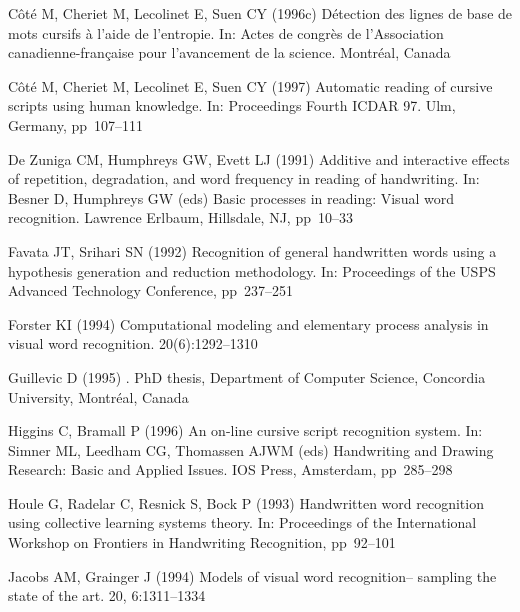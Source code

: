 \documentclass[ijdar]{svjour}
\begin{document}
\begin{thebibliography}{88}
 C\^ot\'e M, Cheriet M, Lecolinet E, Suen CY (1996c)
\newblock D\'etec\-tion des lignes de base de mots cursifs \`a l'aide de
  l'entropie.
\newblock In: {Actes de congr\`es de l'Association canadienne-fran\c{c}aise
  pour l'avancement de la science}. Montr\'eal, Canada

 C\^ot\'e M, Cheriet M, Lecolinet E, Suen CY (1997)
\newblock Automatic reading of cursive scripts using human knowledge.
\newblock In: {Proceedings Fourth ICDAR 97}. Ulm, Germany, pp~107--111

 De Zuniga CM, Humphreys GW, Evett LJ (1991)
\newblock Additive and interactive effects of repetition, degradation, and word
  frequency in reading of handwriting.
\newblock In: Besner D, Humphreys GW (eds) {Basic processes in
  reading: Visual word recognition}. Lawrence Erlbaum,
  Hillsdale, NJ, pp~10--33

 Favata JT, Srihari SN (1992)
\newblock Recognition of general handwritten words using a hypothesis generation and reduction methodology.
\newblock In: {Proceedings of the USPS Advanced Technology
Conference}, pp~237--251

 Forster KI (1994)
\newblock Computational modeling and elementary process analysis in visual word
  recognition.
20(6):1292--1310

 Guillevic D (1995)
.
\newblock PhD thesis, Department of Computer Science, Concordia University,
  Montr\'eal, Canada


 Higgins C, Bramall P (1996)
\newblock An on-line cursive script recognition system.
\newblock In: Simner ML, Leedham CG, Tho\-massen AJWM (eds)
{Handwriting and Drawing Research: Basic and Applied Issues}.
  IOS Press, Amsterdam, pp~285--298

 Houle G, Radelar C, Resnick S, Bock P (1993)
\newblock Handwritten word recognition using collective learning systems theory.
\newblock  In: {Proceedings of the International Workshop on Frontiers
in Handwriting Recognition}, pp~92--101


 Jacobs AM, Grainger J (1994)
\newblock Models of visual word recogni\-tion-- sampling the state of
the art.
 20,
  6:1311--1334


\end{thebibliography}
\end{document}
